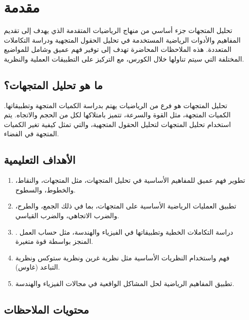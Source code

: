 \chapter*{ مقدمة}
 تحليل المتجهات جزء أساسي من منهاج الرياضيات المتقدمة الذي يهدف إلى تقديم المفاهيم والأدوات الرياضية المستخدمة في تحليل الحقول المتجهية ودراسة التكاملات المتعددة. هذه الملاحظات المحاضرة تهدف إلى توفير فهم عميق وشامل للمواضيع المختلفة التي سيتم تناولها خلال الكورس، مع التركيز على التطبيقات العملية والنظرية.

\section*{ ما هو تحليل المتجهات؟}

تحليل المتجهات هو فرع من الرياضيات يهتم بدراسة الكميات المتجهة وتطبيقاتها. الكميات المتجهة، مثل القوة والسرعة، تتميز بامتلاكها لكل من الحجم والاتجاه. يتم استخدام تحليل المتجهات لتحليل الحقول المتجهية، والتي تمثل كيفية تغير الكميات المتجهة في الفضاء.

\section*{ الأهداف التعليمية }
\begin{enumerate}
    \item تطوير فهم عميق للمفاهيم الأساسية في تحليل المتجهات، مثل المتجهات، والنقاط، والخطوط، والسطوح.
    \item  تطبيق العمليات الرياضية الأساسية على المتجهات، بما في ذلك الجمع، والطرح، والضرب الاتجاهي، والضرب القياسي.
    \item . دراسة التكاملات الخطية وتطبيقاتها في الفيزياء والهندسة، مثل حساب العمل المنجز بواسطة قوة متغيرة.
    \item  فهم واستخدام النظريات الأساسية مثل نظرية غرين ونظرية ستوكس ونظرية التباعد (غاوس).
    \item  تطبيق المفاهيم الرياضية لحل المشاكل الواقعية في مجالات الفيزياء والهندسة.
\end{enumerate}
\section*{ محتويات الملاحظات}

